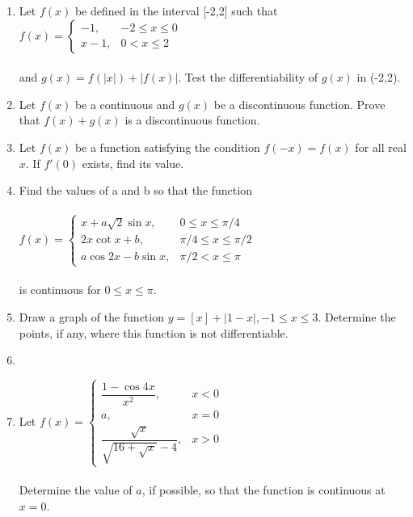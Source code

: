 \begin{enumerate}[label=\arabic*.,ref=\thesubsection.\theenumi]
\item Let $f(x)$ be defined in the interval [-2,2] such that $f(x)=\begin{cases}
-1, &\text{$-2\leq x\leq 0$}\\
x-1, &\text{$0<x\leq 2$}
\end{cases}$ \\ \\and $g(x)=f(|x|)+|f(x)|$. Test the differentiability of $g(x)$ in (-2,2).\\

\item Let $f(x)$ be a continuous and $g(x)$ be a discontinuous function. Prove that $f(x)+g(x)$ is a discontinuous function.\\

\item Let $f(x)$ be a function satisfying the condition $f(-x)=f(x)$ for all real $x$. If $f'(0)$ exists, find its value.\\

\item Find the values of a and b so that the function\\ \\
$f(x)=\begin{cases}
x+a\sqrt{2}\sin x, &\text{$0\leq x\leq \pi/4$}\\
2x\cot x+b, &\text{$\pi/4\leq x\leq \pi/2$}\\
a\cos 2x-b \sin x, &\text{$\pi/2<x\leq \pi$}
\end{cases}$\\ \\is continuous for $0\leq x\leq \pi$.\\

\item Draw a graph of the function $y=[x]+|1-x|, -1\leq x\leq 3$. Determine the points, if any, where this function is not differentiable.
\item[~] 

\item Let $f(x)=\begin{cases}
\dfrac{1-\cos 4x}{x^2}, &\text{$x<0$}\\
a, &\text{$x=0$}\\
\dfrac{\sqrt{x}}{\sqrt{16+\sqrt{x}}-4}, &\text{$x>0$}
\end{cases}$\\ \\ Determine the value of $a$, if possible, so that the function is continuous at $x=0$.\\


\end{enumerate}
